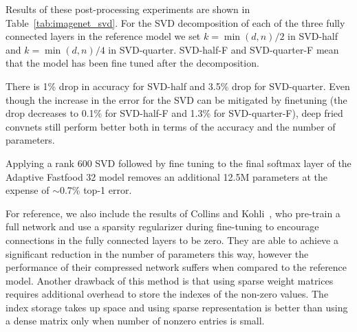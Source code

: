 \documentclass[10pt,twocolumn,letterpaper]{article}
\begin{document}
Results of these post-processing experiments are shown in Table~\ref{tab:imagenet_svd}. For the SVD decomposition of each of the three fully connected
layers in the reference model we set $k = \min(d, n)/2$ in SVD-half and
$k = \min(d, n)/4$ in SVD-quarter. SVD-half-F and SVD-quarter-F mean that the
model has been fine tuned after the decomposition.

There is 1\% drop in accuracy for SVD-half and 3.5\%
drop for SVD-quarter. Even though the increase in the error for the SVD can be mitigated by finetuning (the drop decreases to 0.1\% for SVD-half-F and 1.3\% for
SVD-quarter-F), deep fried convnets still perform better both in terms of the accuracy and the number of parameters.

Applying a rank 600 SVD followed by fine tuning to the final softmax layer of the Adaptive Fastfood 32 model removes an additional 12.5M parameters at the expense of $\sim$0.7\% top-1 error.

For reference, we also include the results of Collins and Kohli~\cite{Collins2014}, who pre-train a full network and use a sparsity regularizer during fine-tuning to encourage connections in the fully connected layers to be zero.  They are able to achieve a significant reduction in the number of parameters this way, however the performance of their compressed network suffers when compared to the reference model.  Another drawback of this method is that using sparse weight matrices requires additional overhead to store the indexes of the non-zero values.  The index storage takes up space and using sparse representation is better than using a dense matrix
  only when number of nonzero entries is small.
\end{document}
